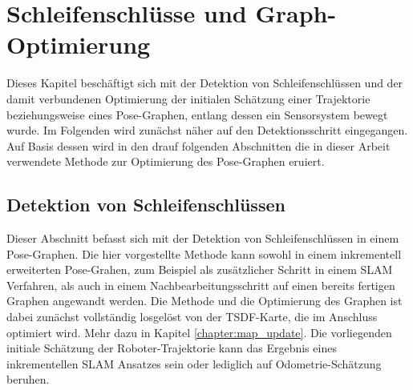 \chapter{Schleifenschlüsse und Graph-Optimierung}
\label{chapter:loop_closure}

Dieses Kapitel beschäftigt sich mit der Detektion von Schleifenschlüssen und der damit verbundenen Optimierung der initialen Schätzung einer Trajektorie beziehungsweise eines Pose-Graphen, entlang dessen ein Sensorsystem bewegt wurde. Im Folgenden wird zunächst näher auf den Detektionsschritt eingegangen. Auf Basis dessen wird in den drauf folgenden Abschnitten die in dieser Arbeit verwendete Methode zur Optimierung des Pose-Graphen eruiert.

\section{Detektion von Schleifenschlüssen}

Dieser Abschnitt befasst sich mit der Detektion von Schleifenschlüssen in einem Pose-Graphen. Die hier vorgestellte Methode kann sowohl in einem inkrementell erweiterten Pose-Grahen, zum Beispiel als zusätzlicher Schritt in einem SLAM Verfahren, als auch in einem Nachbearbeitungsschritt auf einen bereits fertigen Graphen angewandt werden. Die Methode und die Optimierung des Graphen ist dabei zunächst vollständig losgelöst von der TSDF-Karte, die im Anschluss optimiert wird. Mehr dazu in Kapitel \ref{chapter:map_update}. Die vorliegenden initiale Schätzung der Roboter-Trajektorie kann das Ergebnis eines inkrementellen SLAM Ansatzes sein oder lediglich auf Odometrie-Schätzung beruhen.

